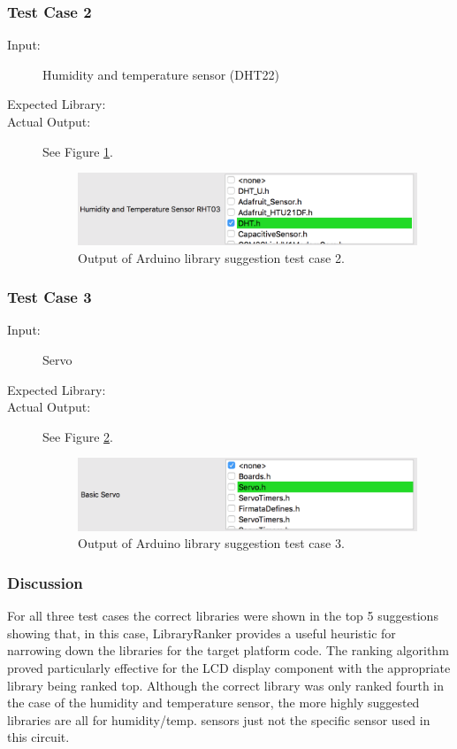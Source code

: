 \documentclass{UoYCSproject}
\begin{document}
\subsubsection{Test Case 2} \label{arduino_tc2}
\begin{description}
\item[Input:] Humidity and temperature sensor (DHT22)
\item[Expected Library:] 
\item[Actual Output:] See Figure \ref{fig:lib_suggest_humidity}.
\begin{figure}[h!]
  \centering
  \includegraphics[width=0.5\linewidth]{graphics/lib_suggest_humidity.png}
  \caption{Output of Arduino library suggestion test case 2.}
  \label{fig:lib_suggest_humidity}
\end{figure}
\end{description}

\subsubsection{Test Case 3} \label{arduino_tc3}
\begin{description}
\item[Input:] Servo
\item[Expected Library:] 
\item[Actual Output:] See Figure \ref{fig:lib_suggest_servo}.
\begin{figure}[h!]
  \centering
  \includegraphics[width=0.5\linewidth]{graphics/lib_suggest_servo.png}
  \caption{Output of Arduino library suggestion test case 3.}
  \label{fig:lib_suggest_servo}
\end{figure}
\end{description}

\subsubsection{Discussion} \label{arduino_lib_discussion}
For all three test cases the correct libraries were shown in the top 5 suggestions showing that, in this case, LibraryRanker provides a useful heuristic for narrowing down the libraries for the target platform code. The ranking algorithm proved particularly effective for the LCD display component with the appropriate  library being ranked top. Although the correct library was only ranked fourth in the case of the humidity and temperature sensor, the more highly suggested libraries are all for humidity/temp. sensors just not the specific  sensor used in this circuit.
\end{document}
